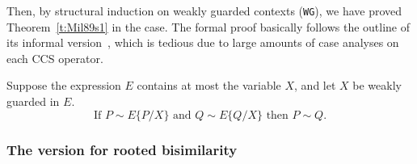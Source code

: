 Then, by structural induction on weakly guarded contexts
(\texttt{WG}), we have proved Theorem~\ref{t:Mil89s1}
in the \univariate case. The formal proof basically follows the outline of its
informal version~\citep[p.~102--103]{Mil89}, which is tedious due to
large amounts of case analyses on each CCS operator.
\begin{theorem}
  \label{thm:Mil89s1f}
Suppose the expression $E$ contains at most the variable $X$, and let $X$ be weakly
guarded in $E$.
\begin{equation}
\text{If } P \sim E\{P/X\} \text{ and } Q \sim E\{Q/X\} \text{ then }
P \sim Q.
\end{equation}
\begin{alltt}
\HOLTokenTurnstile{}   \HOLSymConst{\HOLTokenConj{}}  \HOLSymConst{\HOLTokenStrongEQ}   \HOLSymConst{\HOLTokenConj{}}  \HOLSymConst{\HOLTokenStrongEQ}   \HOLSymConst{\HOLTokenImp{}}  \HOLSymConst{\HOLTokenStrongEQ} 
\end{alltt}
\end{theorem}

\subsubsection{The version for rooted bisimilarity}

